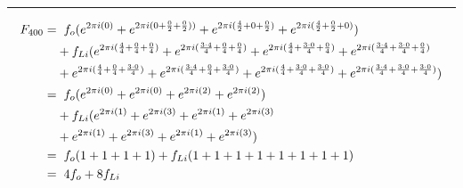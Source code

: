 \documentclass{article}
\begin{document}
\noindent\rule{12cm}{0.4pt}
\begin{align*}
	F_{400} =& \hspace{0.2cm}  f_{o}  (e^{2 \pi i (0)} 
	+ e^{2 \pi i (0 + \frac{0}{2} + \frac{0}{2}))} 
	+ e^{2 \pi i (\frac{4}{2} + 0 + \frac{0}{2})} 
	+ e^{2 \pi i (\frac{4}{2} + \frac{0}{2} + 0)})  \\
	&+ f_{Li} (e^{2 \pi i (\frac{4}{4} + \frac{0}{4} + \frac{0}{4})}  
	+ e^{2 \pi i (\frac{3 \cdot 4}{4} + \frac{0}{4} + \frac{0}{4})} 
	+ e^{2 \pi i (\frac{4}{4} + \frac{3 \cdot 0}{4} + \frac{0}{4})} 
	+ e^{2 \pi i (\frac{3 \cdot 4}{4} + \frac{3 \cdot 0}{4} + \frac{0}{4})} \\
	&+ e^{2 \pi i (\frac{4}{4} + \frac{0}{4} + \frac{3 \cdot 0}{4})}
	+ e^{2 \pi i (\frac{3 \cdot 4}{4} + \frac{0}{4} + \frac{3 \cdot 0}{4})} 
	+ e^{2 \pi i (\frac{4}{4} + \frac{3 \cdot 0}{4} + \frac{3 \cdot 0}{4})} 
	+ e^{2 \pi i (\frac{3 \cdot 4}{4} + \frac{3 \cdot 0}{4} + \frac{3 \cdot 0}{4})}) \\  
	=& \hspace{0.2cm}  f_{o}  (e^{2 \pi i (0)} 
	+ e^{2 \pi i (0)} 
	+ e^{2 \pi i (2)} 
	+ e^{2 \pi i (2)})  \\
	&+ f_{Li} (e^{2 \pi i (1)}  
	+ e^{2 \pi i (3)} 
	+ e^{2 \pi i (1)} 
	+ e^{2 \pi i (3)} \\
	&+ e^{2 \pi i (1)}
	+ e^{2 \pi i (3)} 
	+ e^{2 \pi i (1)} 
	+ e^{2 \pi i (3)}) \\
	=& \hspace{0.2cm}  f_{o}  (1  + 1 + 1 + 1) + f_{Li}(1 + 1 + 1 + 1 + 1 + 1 + 1 + 1) \\
	=& \hspace{0.2cm} 4f_{o}   + 8f_{Li}
\end{align*}
\end{document}
